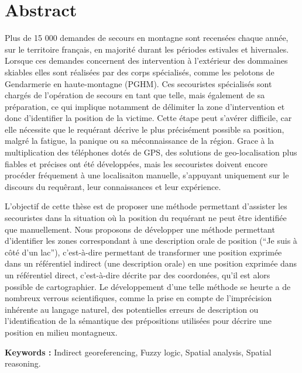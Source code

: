 \section*{Abstract}

Plus de 15 000 demandes de secours en montagne sont recensées chaque
année, sur le territoire français, en majorité durant les périodes
estivales et hivernales. Lorsque ces demandes concernent des
intervention à l'extérieur des dommaines skiables elles sont réalisées
par des corps spécialisés, comme les pelotons de Gendarmerie en
haute-montagne (PGHM). Ces secouristes spécialisés sont chargés de
l'opération de secours en tant que telle, mais également de sa
préparation, ce qui implique notamment de délimiter la zone
d'intervention et donc d'identifier la position de la victime. Cette
étape peut s'avérer difficile, car elle nécessite que le requérant
décrive le plus précisément possible sa position, malgré la fatigue,
la panique ou sa méconnaissance de la région. Grace à la
multiplication des téléphones dotés de GPS, des solutions de
geo-localisation plus fiables et précises ont été développées, mais
les secouristes doivent encore procéder fréquement à une localisaiton
manuelle, s'appuyant uniquement sur le discours du requêrant, leur
connaissances et leur expérience. 

L'objectif de cette thèse est de proposer une méthode permettant
d'assister les secouristes dans la situation où la position du
requérant ne peut être identifiée que manuellement. Nous proposons de
développer une méthode permettant d'identifier les zones correspondant
à une description orale de position (\eg \enquote{Je suis à côté d'un lac}),
c'est-à-dire permettant de transformer une position exprimée dans un
référentiel indirect (une description orale) en une position exprimée
dans un référentiel direct, c'est-à-dire décrite par des coordonées,
qu'il est alors possible de cartographier. Le développement d'une
telle méthode se heurte a de nombreux verrous scientifiques, comme la
prise en compte de l'imprécision inhérente au langage naturel, des
potentielles erreurs de description ou l’identification de la
sémantique des prépositions utilisées pour décrire une position en
milieu montagneux.

\vspace{.5cm}

\noindent\textbf{Keywords :} Indirect georeferencing, Fuzzy logic,
Spatial analysis, Spatial reasoning.\par